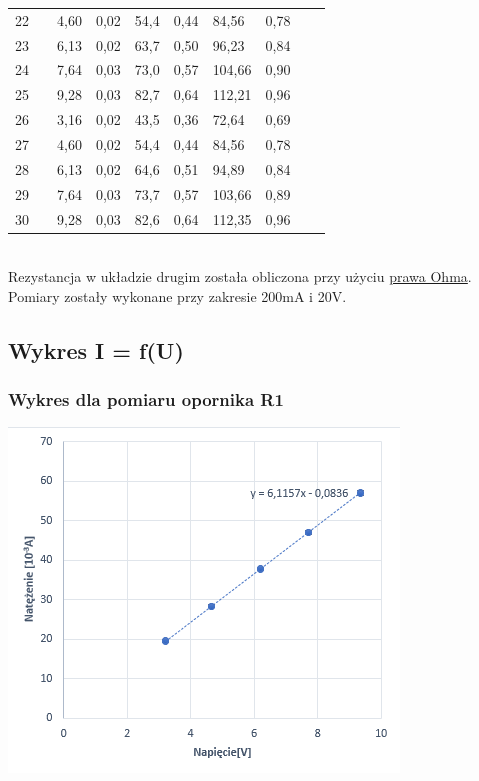 \documentclass[12pt]{article}
\begin{document}
\begin{adjustbox}{center}
\begin{tabular}{|p{0.5cm}|p{1.5cm}|p{1.2cm}|p{1.5cm}|p{1.5cm}|p{2cm}|p{1.3cm}|p{1.5cm}|p{1.5cm}|p{1.5cm}|}
    22 && 4,60 & 0,02 & 54,4 & 0,44 & 84,56& 0,78  && \\
    23 && 6,13 & 0,02 & 63,7 & 0,50 & 96,23& 0,84  && \\
    24 && 7,64 & 0,03 & 73,0 & 0,57 & 104,66& 0,90  && \\
    25 && 9,28 & 0,03 & 82,7 & 0,64 & 112,21& 0,96  && \\
    26 && 3,16 & 0,02 & 43,5 & 0,36 & 72,64& 0,69   &&\\
    27 && 4,60 & 0,02 & 54,4 & 0,44 & 84,56& 0,78   &&\\
    28 && 6,13 & 0,02 & 64,6 & 0,51 & 94,89& 0,84  && \\
    29 && 7,64 & 0,03 & 73,7 & 0,57 & 103,66& 0,89  && \\
    30 && 9,28 & 0,03 & 82,6 & 0,64 & 112,35& 0,96 && \\
    \hline
\end{tabular}
\end{adjustbox}\\

Rezystancja w układzie drugim została obliczona przy użyciu \hyperlink{ohm}{prawa Ohma}.
Pomiary zostały wykonane przy zakresie 200mA i 20V.

\subsection{Wykres I = f(U)}

\subsubsection{Wykres dla pomiaru opornika R1}
\includegraphics{pomiar1.png}
\end{document}
